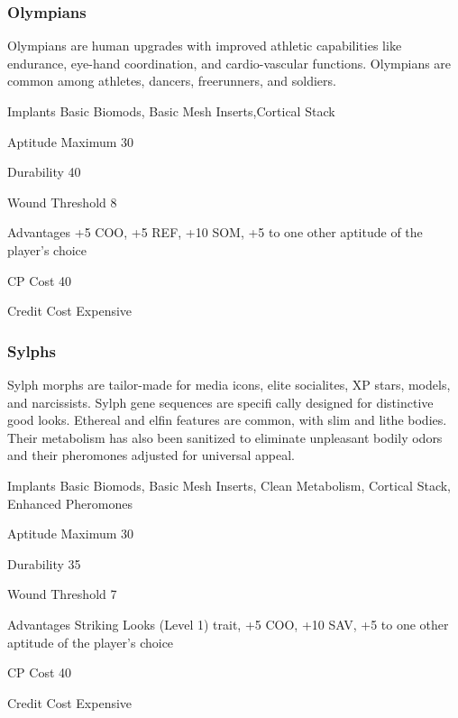 \subsubsection{Olympians}
\label{sec:starting-olympians}

Olympians are human upgrades with improved athletic capabilities like endurance, eye-hand coordination, and cardio-vascular functions. Olympians are common among athletes, dancers, freerunners, and soldiers.

\begin{description*}
\item[Implants] Basic Biomods, Basic Mesh Inserts,Cortical Stack 
\item[Aptitude Maximum] 30 
\item[Durability] 40 
\item[Wound Threshold] 8 
\item[Advantages] +5 COO, +5 REF, +10 SOM, +5 to one other aptitude of the player’s choice
\item[CP Cost] 40 
\item[Credit Cost] Expensive 
\end{description*}

\subsubsection{Sylphs}
\label{sec:starting-sylphs}

Sylph morphs are tailor-made for media icons, elite socialites, XP stars, models, and narcissists. Sylph gene sequences are specifi cally designed for distinctive good looks. Ethereal and elfin features are common, with slim and lithe bodies. Their metabolism has also been sanitized to eliminate unpleasant bodily odors and their pheromones adjusted for universal appeal.

\begin{description*}
\item[Implants] Basic Biomods, Basic Mesh Inserts, Clean Metabolism, Cortical Stack, Enhanced Pheromones
\item[Aptitude Maximum] 30 
\item[Durability] 35 
\item[Wound Threshold] 7 
\item[Advantages] Striking Looks (Level 1) trait, +5 COO, +10 SAV, +5 to one other aptitude of the player’s choice
\item[CP Cost] 40 
\item[Credit Cost] Expensive 
\end{description*}

